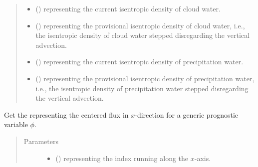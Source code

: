 \documentclass[letterpaper,10pt,english]{sphinxmanual}
\begin{document}
\begin{fulllineitems}
\begin{fulllineitems}
\begin{quote}
\begin{description}
\begin{itemize}
\item {} 
 () \textendash{}  representing the current isentropic density of cloud water.

\item {} 
 () \textendash{}  representing the provisional isentropic density of cloud water,
i.e., the isentropic density of cloud water stepped disregarding the vertical advection.

\item {} 
 () \textendash{}  representing the current isentropic density of precipitation water.

\item {} 
 () \textendash{}  representing the provisional isentropic density of precipitation water,
i.e., the isentropic density of precipitation water stepped disregarding the vertical advection.

\end{itemize}

\end{description}\end{quote}

\end{fulllineitems}


\begin{fulllineitems}
\label{\detokenize{api:tasmania.dycore.flux_isentropic_centered.FluxIsentropicCentered._get_centered_flux_x}}
Get the  representing the centered flux in \(x\)-direction
for a generic prognostic variable \(\phi\).
\begin{quote}\begin{description}
\item[{Parameters}] \leavevmode\begin{itemize}
\item {} 
 () \textendash{}  representing the index running along the \(x\)-axis.


\end{itemize}
\end{description}
\end{quote}
\end{fulllineitems}
\end{fulllineitems}
\end{document}
